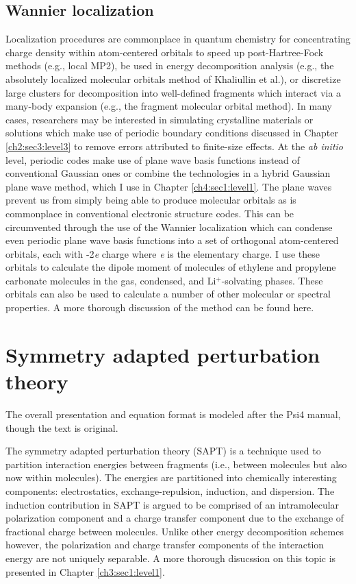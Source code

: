 \begin{theory}
  \subsection{\label{ch2:sec1:level5}Wannier localization}
  Localization procedures are commonplace in quantum chemistry for concentrating charge density within atom-centered
  orbitals to speed up post-Hartree-Fock methods (e.g., local MP2\cite{lee2000closely}), be used in energy decomposition 
  analysis (e.g., the absolutely localized molecular orbitals method of Khaliullin et al.\cite{khaliullin2008almo}), or 
  discretize large clusters for decomposition into well-defined fragments which interact via a many-body expansion (e.g., 
  the fragment molecular orbital method\cite{kitaura1999fragment}). In many cases, researchers may be interested in
  simulating crystalline materials or solutions which make use of periodic 
  boundary conditions discussed in Chapter \ref{ch2:sec3:level3} to remove errors attributed to finite-size
  effects. At the \emph{ab initio} level, periodic codes make use of plane wave basis functions instead of
  conventional Gaussian ones or combine the technologies in a hybrid Gaussian plane wave method, which I use
  in Chapter \ref{ch4:sec1:level1}. The plane waves prevent us from simply being able to produce molecular
  orbitals as is commonplace in conventional electronic structure codes. This can be circumvented through
  the use of the Wannier localization which can condense even periodic plane wave basis functions into a set 
  of orthogonal atom-centered orbitals, each with -2\emph{e} charge where \emph{e} is the elementary charge.
  I use these orbitals to calculate the dipole moment of molecules of ethylene and propylene carbonate 
  molecules in the gas, condensed, and Li$^{+}$-solvating phases. These orbitals can also be used to calculate
  a number of other molecular or spectral properties. A more thorough discussion of the method can be found 
  here\cite{marzari2003mlwf}.
  
 \section{\label{ch2:sec2:level1}Symmetry adapted perturbation theory}
  The overall presentation and equation format is modeled after the Psi4 manual\cite{psi4sapt}, though the text 
  is original.
 
  The symmetry adapted perturbation theory (SAPT) is a technique used to partition interaction energies between
  fragments (i.e., between molecules but also now within 
  molecules\cite{parrish2015communication,pastorczak2015intramolecular}). The energies are partitioned
  into chemically interesting components: electrostatics, exchange-repulsion, induction, and dispersion. The
  induction contribution in SAPT is argued to be comprised of an intramolecular polarization component and a
  charge transfer component due to the exchange of fractional charge between molecules. Unlike other energy 
  decomposition schemes however, the polarization and charge transfer components of the interaction energy are
  not uniquely separable. A more thorough disucssion on this topic is presented in Chapter \ref{ch3:sec1:level1}.
  

\end{theory}

